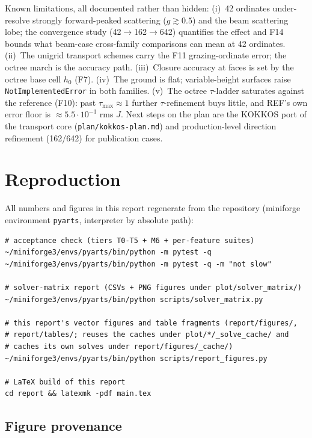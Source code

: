 \documentclass[11pt,a4paper]{article}
\begin{document}
Known limitations, all documented rather than hidden:
(i)~42 ordinates under-resolve strongly forward-peaked scattering
($g\gtrsim0.5$) and the beam scattering lobe; the convergence study
(42$\to$162$\to$642) quantifies the effect and F14 bounds what
beam-case cross-family comparisons can mean at 42 ordinates.
(ii)~The unigrid transport schemes carry the F11 grazing-ordinate error;
the octree march is the accuracy path.
(iii)~Closure accuracy at faces is set by the octree base cell $h_0$
(F7).
(iv)~The ground is flat; variable-height surfaces raise
\texttt{NotImplementedError} in both families.
(v)~The octree $\tau$-ladder saturates against the reference (F10):
past $\tau_{\max}\approx1$ further $\tau$-refinement buys little, and
REF's own error floor is $\approx5.5\cdot10^{-3}$ rms $J$.
Next steps on the plan are the KOKKOS port of the transport core
(\texttt{plan/kokkos-plan.md}) and production-level direction refinement
(162/642) for publication cases.

\appendix
\section{Reproduction}
\label{sec:reproduce}

All numbers and figures in this report regenerate from the repository
(miniforge environment \texttt{pyarts}, interpreter by absolute path):

\begin{verbatim}
# acceptance check (tiers T0-T5 + M6 + per-feature suites)
~/miniforge3/envs/pyarts/bin/python -m pytest -q
~/miniforge3/envs/pyarts/bin/python -m pytest -q -m "not slow"

# solver-matrix report (CSVs + PNG figures under plot/solver_matrix/)
~/miniforge3/envs/pyarts/bin/python scripts/solver_matrix.py

# this report's vector figures and table fragments (report/figures/,
# report/tables/; reuses the caches under plot/*/_solve_cache/ and
# caches its own solves under report/figures/_cache/)
~/miniforge3/envs/pyarts/bin/python scripts/report_figures.py

# LaTeX build of this report
cd report && latexmk -pdf main.tex
\end{verbatim}

\subsection*{Figure provenance}
\end{document}
